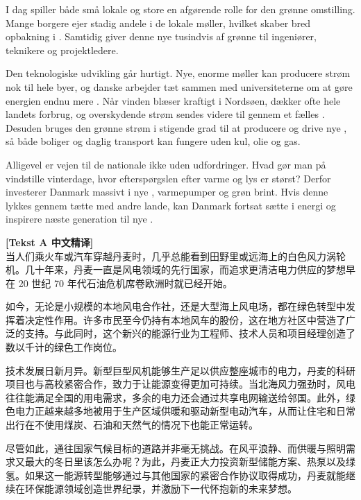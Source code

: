 I dag spiller både små lokale  og store  en afgørende rolle for den grønne omstilling. Mange borgere ejer stadig andele i de lokale møller, hvilket skaber bred opbakning i . Samtidig giver denne nye  tusindvis af grønne  til ingeniører, teknikere og projektledere.

Den teknologiske udvikling går hurtigt. Nye, enorme møller kan producere strøm nok til hele byer, og danske  arbejder tæt sammen med universiteterne om at gøre energien endnu mere . Når vinden blæser kraftigt i Nordsøen, dækker  ofte hele landets forbrug, og overskydende strøm sendes videre til  gennem et fælles . Desuden bruges den grønne strøm i stigende grad til at producere  og drive nye , så både boliger og daglig transport kan fungere uden kul, olie og gas.

Alligevel er vejen til de nationale  ikke uden udfordringer. Hvad gør man på vindstille vinterdage, hvor efterspørgslen efter varme og lys er størst? Derfor investerer Danmark massivt i nye , varmepumper og grøn brint. Hvis denne  lykkes gennem tætte  med andre lande, kan Danmark fortsat sætte  i  energi og inspirere næste generation til nye .

\begin{transbox}
\small
\textbf{\color{NCDTeal}[Tekst A 中文精译]}\\
当人们乘火车或汽车穿越丹麦时，几乎总能看到田野里或远海上的白色风力涡轮机。几十年来，丹麦一直是风电领域的先行国家，而追求更清洁电力供应的梦想早在 20 世纪 70 年代石油危机席卷欧洲时就已经开始。

如今，无论是小规模的本地风电合作社，还是大型海上风电场，都在绿色转型中发挥着决定性作用。许多市民至今仍持有本地风车的股份，这在地方社区中营造了广泛的支持。与此同时，这个新兴的能源行业为工程师、技术人员和项目经理创造了数以千计的绿色工作岗位。

技术发展日新月异。新型巨型风机能够生产足以供应整座城市的电力，丹麦的科研项目也与高校紧密合作，致力于让能源变得更加可持续。当北海风力强劲时，风电往往能满足全国的用电需求，多余的电力还会通过共享电网输送给邻国。此外，绿色电力正越来越多地被用于生产区域供暖和驱动新型电动汽车，从而让住宅和日常出行在不使用煤炭、石油和天然气的情况下也能正常运转。

尽管如此，通往国家气候目标的道路并非毫无挑战。在风平浪静、而供暖与照明需求又最大的冬日里该怎么办呢？为此，丹麦正大力投资新型储能方案、热泵以及绿氢。如果这一能源转型能够通过与其他国家的紧密合作协议取得成功，丹麦就能继续在环保能源领域创造世界纪录，并激励下一代怀抱新的未来梦想。
\end{transbox}

